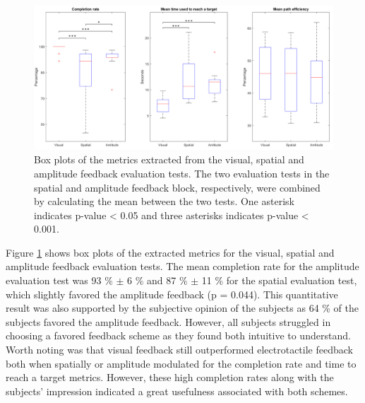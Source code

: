 \begin{figure}[h]                 
	\includegraphics[width=1\textwidth]{figures/boxplot_results}
	\caption{Box plots of the metrics extracted from the visual, spatial and amplitude feedback evaluation tests. The two evaluation tests in the spatial and amplitude feedback block, respectively, were combined by calculating the mean between the two tests. One asterisk indicates p-value < 0.05 and three asterisks indicates p-value < 0.001.}
	\label{fig:pa:boxplot_results} 
\end{figure}
Figure \ref{fig:pa:boxplot_results} shows box plots of the extracted metrics for the visual, spatial and amplitude feedback evaluation tests. The mean completion rate for the amplitude evaluation test was 93 \% $\pm$ 6 \% and 87 \% $\pm$ 11 \% for the spatial evaluation test, which slightly favored the amplitude feedback (p = 0.044). This quantitative result was also supported by the subjective opinion of the subjects as 64 \% of the subjects favored the amplitude feedback. However, all subjects struggled in choosing a favored feedback scheme as they found both intuitive to understand. Worth noting was that visual feedback still outperformed electrotactile feedback both when spatially or amplitude modulated for the completion rate and time to reach a target metrics. However, these high completion rates along with the subjects' impression indicated a great usefulness associated with both schemes.  


